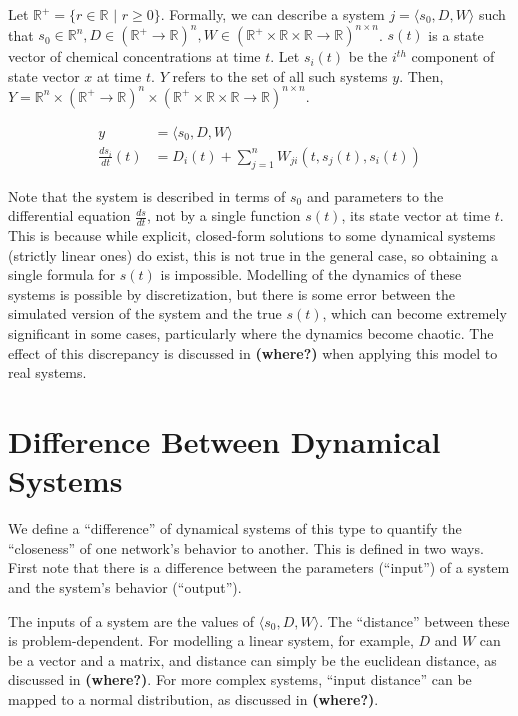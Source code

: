 \documentclass{article}
\begin{document}
Let $\mathbb{R}^+ = \{r \in \mathbb{R} \,\,|\,\, r \ge 0\}$. Formally, we can describe a system $j = \langle s_0, D, W \rangle$ such that $s_0 \in \mathbb{R}^n, D \in (\mathbb{R}^+ \to \mathbb{R})^n, W \in (\mathbb{R}^+ \times \mathbb{R} \times \mathbb{R} \to \mathbb{R})^{n \times n}$. $s(t)$ is a state vector of chemical concentrations at time $t$. Let $s_i(t)$ be the $i^{th}$ component of state vector $x$ at time $t$. $Y$ refers to the set of all such systems $y$. Then, $Y = \mathbb{R}^n \times (\mathbb{R}^+ \to \mathbb{R})^n \times (\mathbb{R}^+ \times \mathbb{R} \times \mathbb{R} \to \mathbb{R})^{n \times n}$.

\begin{align}
  y &= \langle s_0, D, W \rangle \label{system-defn} \\
  \frac{ds_i}{dt}(t) &= D_i(t) + \sum_{j = 1}^n W_{ji}(t, s_j(t), s_i(t)) \label{system-diffeq}
\end{align}

Note that the system is described in terms of $s_0$ and parameters to the differential equation $\frac{ds}{dt}$, not by a single function $s(t)$, its state vector at time $t$. This is because while explicit, closed-form solutions to some dynamical systems (strictly linear ones) do exist, this is not true in the general case, so obtaining a single formula for $s(t)$ is impossible. Modelling of the dynamics of these systems is possible by discretization, but there is some error between the simulated version of the system and the true $s(t)$, which can become extremely significant in some cases, particularly where the dynamics become chaotic. The effect of this discrepancy is discussed in \textbf{(where?)} when applying this model to real systems.

\section{Difference Between Dynamical Systems} \label{similarity}
We define a ``difference'' of dynamical systems of this type to quantify the ``closeness'' of one network's behavior to another. This is defined in two ways. First note that there is a difference between the parameters (``input'') of a system and the system's behavior (``output'').

The inputs of a system are the values of $\langle s_0, D, W \rangle$. The ``distance'' between these is problem-dependent. For modelling a linear system, for example, $D$ and $W$ can be a vector and a matrix, and distance can simply be the euclidean distance, as discussed in \textbf{(where?)}. For more complex systems, ``input distance'' can be mapped to a normal distribution, as discussed in \textbf{(where?)}.
\end{document}
